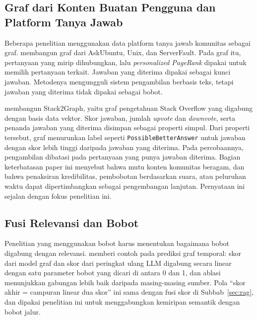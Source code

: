 \subsection{Graf dari Konten Buatan Pengguna dan Platform Tanya Jawab}

Beberapa penelitian menggunakan data platform tanya jawab komunitas sebagai graf. \textcite{Banerjee2024} membangun graf dari AskUbuntu, Unix, dan ServerFault. Pada graf itu, pertanyaan yang mirip dihubungkan, lalu \emph{personalized PageRank} dipakai untuk memilih pertanyaan terkait. Jawaban yang diterima dipakai sebagai kunci jawaban. Metodenya mengungguli sistem pengambilan berbasis teks, tetapi jawaban yang diterima tidak dipakai sebagai bobot.

\textcite{Kleybolte2026} membangun Stack2Graph, yaitu graf pengetahuan Stack Overflow yang digabung dengan basis data vektor. Skor jawaban, jumlah \emph{upvote} dan \emph{downvote}, serta penanda jawaban yang diterima disimpan sebagai properti simpul. Dari properti tersebut, graf menurunkan label seperti \texttt{PossibleBetterAnswer} untuk jawaban dengan skor lebih tinggi daripada jawaban yang diterima. Pada percobaannya, pengambilan dibatasi pada pertanyaan yang punya jawaban diterima. Bagian keterbatasan paper ini menyebut bahwa mutu konten komunitas beragam, dan bahwa penaksiran kredibilitas, pembobotan berdasarkan suara, atau peluruhan waktu dapat dipertimbangkan sebagai pengembangan lanjutan. Pernyataan ini sejalan dengan fokus penelitian ini.

\subsection{Fusi Relevansi dan Bobot}

Penelitian yang menggunakan bobot harus menentukan bagaimana bobot digabung dengan relevansi. \textcite{LiSKER2026} memberi contoh pada prediksi graf temporal: skor dari model graf dan skor dari peringkat ulang LLM digabung secara linear dengan satu parameter bobot yang dicari di antara 0 dan 1, dan ablasi menunjukkan gabungan lebih baik daripada masing-masing sumber. Pola ``skor akhir = campuran linear dua skor'' ini sama dengan fusi skor di Subbab~\ref{sec:rag}, dan dipakai penelitian ini untuk menggabungkan kemiripan semantik dengan bobot jalur.

